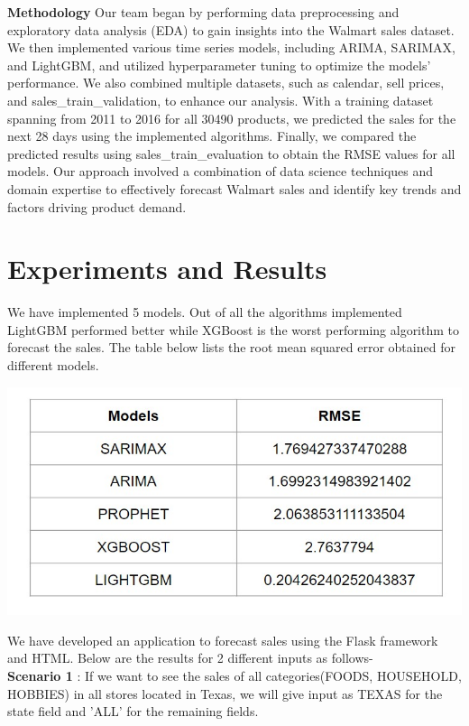 \documentclass[fleqn,10pt]{SelfArx} %
\begin{document}
\item\textbf{Methodology}
Our team began by performing data preprocessing and exploratory data analysis (EDA) to gain insights into the Walmart sales dataset. We then implemented various time series models, including ARIMA, SARIMAX, and LightGBM, and utilized hyperparameter tuning to optimize the models' performance. We also combined multiple datasets, such as calendar, sell prices, and sales\_train\_validation, to enhance our analysis. With a training dataset spanning from 2011 to 2016 for all 30490 products, we predicted the sales for the next 28 days using the implemented algorithms. Finally, we compared the predicted results using sales\_train\_evaluation to obtain the RMSE values for all models. Our approach involved a combination of data science techniques and domain expertise to effectively forecast Walmart sales and identify key trends and factors driving product demand.
\bigskip
\bigskip
\section{Experiments and Results}
We have implemented 5 models. Out of all the algorithms implemented LightGBM performed better while XGBoost is the worst performing algorithm to forecast the sales. The table below lists the root mean squared error obtained for different models.

\includegraphics[scale=0.6]{models.jpg}
\item We have developed an application to forecast sales using the Flask framework and HTML. Below are the results for 2 different inputs as follows-
\\ \textbf{Scenario 1} :
If we want to see the sales of all categories(FOODS, HOUSEHOLD, HOBBIES) in all stores located in Texas, we will give input as TEXAS for the state field and 'ALL' for the remaining fields.
\end{document}
